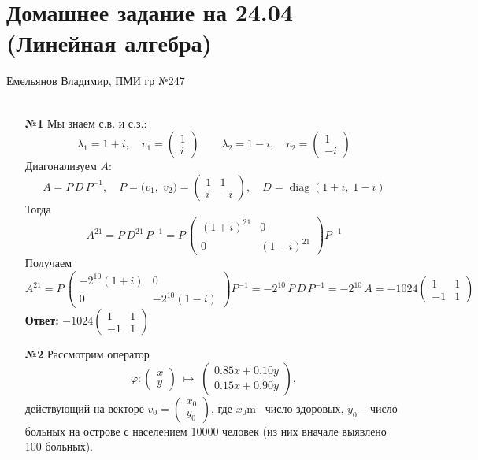 \documentclass[a4paper]{article}
\renewcommand{\phi}{\varphi}
\begin{document}
\section*{Домашнее задание на 24.04 (Линейная алгебра)}
{\large Емельянов Владимир, ПМИ гр №247}\\\\
\begin{enumerate}
  \item[\textbf{№1}]Мы знаем с.в. и с.з.:
  $$\lambda_1=1+i,\quad v_1=\begin{pmatrix}1\\i\end{pmatrix}
  \qquad
  \lambda_2=1-i,\quad v_2=\begin{pmatrix}1\\-i\end{pmatrix}$$
  Диагонализуем \(A\):
  \[
  A = P\,D\,P^{-1},\quad
  P=\bigl(v_1,\;v_2\bigr)
  =\begin{pmatrix}1&1\\i&-i\end{pmatrix},\quad
  D=\operatorname{diag}(1+i,\;1-i)
  \]
  Тогда
  $$
  A^{21}
  = P\,D^{21}\,P^{-1}
  = P\,\begin{pmatrix}(1+i)^{21}&0\\0&(1-i)^{21}\end{pmatrix}P^{-1}
  $$
  Получаем
  $$
  A^{21}
  = P\,\begin{pmatrix}-2^{10}(1+i)&0\\0&-2^{10}(1-i)\end{pmatrix}P^{-1}
  =-2^{10}\,P\,D\,P^{-1}
  =-2^{10}\,A
  =-1024\begin{pmatrix}1&1\\-1&1\end{pmatrix}
  $$
  \textbf{Ответ: } $-1024\begin{pmatrix}1&1\\-1&1\end{pmatrix}$\\

  \item[\textbf{№2}]Рассмотрим оператор
  $$
  \phi:\begin{pmatrix}x\\y\end{pmatrix}\;\longmapsto\;
  \begin{pmatrix}
  0.85x+0.10y\\[6pt]
  0.15x+0.90y
  \end{pmatrix},
  $$
  действующий на векторе
  $\displaystyle v_0=\begin{pmatrix}x_0\\y_0\end{pmatrix}$,
  где $x_0$m– число здоровых, $y_0$ – число больных на острове с населением 10000 человек (из них вначале выявлено 100 больных).


\end{enumerate}
\end{document}

